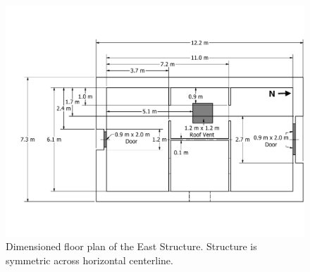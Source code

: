 \documentclass[12pt,oneside]{book}
\begin{document}
\begin{figure}[!ht]
	\includegraphics[width=\columnwidth]{../Figures/Floor_Plans/East_Structure_Dimensioned_Full}
	\caption[Dimensioned floor plan of the East Structure.]{Dimensioned floor plan of the East Structure. Structure is symmetric across horizontal centerline.}
	\label{fig:east_dimensioned_plan}
\end{figure}
\end{document}
